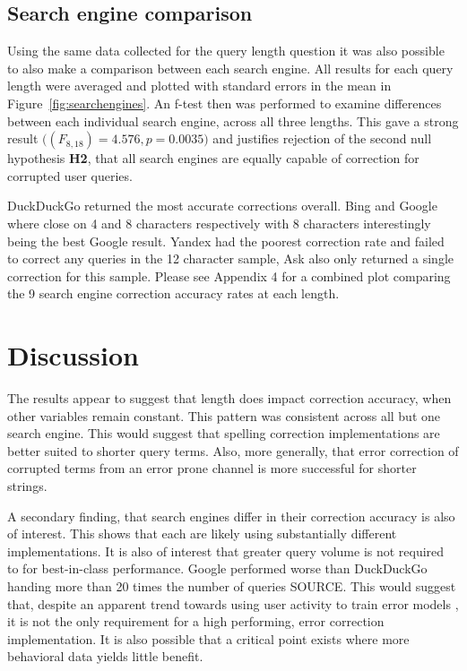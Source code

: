 \documentclass{csfourzero}
\begin{document}
\subsection{Search engine comparison}
Using the same data collected for the query length question it was also possible to also make a comparison between each search engine. All results for each query length were averaged and plotted with standard errors in the mean in Figure~\ref{fig:searchengines}. An f-test then was performed to examine differences between each individual search engine, across all three lengths. This gave a strong result $\big((F_{8,18}) = 4.576, p = 0.0035\big)$ and justifies rejection of the second null hypothesis \textbf{H2}, that all search engines are equally capable of correction for corrupted user queries.

DuckDuckGo returned the most accurate corrections overall. Bing and Google where close on 4 and 8 characters respectively with 8 characters interestingly being the best Google result. Yandex had the poorest correction rate and failed to correct any queries in the 12 character sample, Ask also only returned a single correction for this sample. Please see Appendix 4 for a combined plot comparing the 9 search engine correction accuracy rates at each length.

\section{Discussion}
\label{sec:discuss}

The results appear to suggest that length does impact correction accuracy, when other variables remain constant. This pattern was consistent across all but one search engine. This would suggest that spelling correction implementations are better suited to shorter query terms. Also, more generally, that error correction of corrupted terms from an error prone channel is more successful for shorter strings.

A secondary finding, that search engines differ in their correction accuracy is also of interest. This shows that each are likely using substantially different implementations. It is also of interest that greater query volume is not required to for best-in-class performance. Google performed worse than DuckDuckGo handing more than 20 times the number of queries SOURCE. This would suggest that, despite an apparent trend towards using user activity to train error models \cite{webuserpoweredspelling, webuser3, webuser2learningerrormodel, webuser4google2009}, it is not the only requirement for a high performing, error correction implementation. It is also possible that a critical point exists where more behavioral data yields little benefit.
\end{document}
